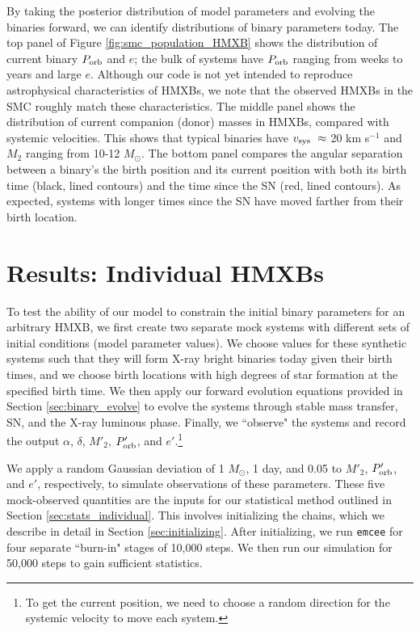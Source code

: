 \documentclass[usenatbib]{mnras}
\newcommand{\Msun}{\ifmmode {M_{\odot}}\else${M_{\odot}}$\fi}
\begin{document}
By taking the posterior distribution of model parameters and evolving the binaries forward, we can identify distributions of binary parameters today. The top panel of Figure \ref{fig:smc_population_HMXB} shows the distribution of current binary $P_{\rm orb}$ and $e$; the bulk of systems have $P_{\rm orb}$ ranging from weeks to years and large $e$. Although our code is not yet intended to reproduce astrophysical characteristics of HMXBs, we note that the observed HMXBs in the SMC roughly match these characteristics. The middle panel shows the distribution of current companion (donor) masses in HMXBs, compared with systemic velocities. This shows that typical binaries have $v_{\rm sys}\ \approx$ 20 km s$^{-1}$ and $M_2$ ranging from 10-12 \Msun. The bottom panel compares the angular separation between a binary's the birth position and its current position with both its birth time (black, lined contours) and the time since the SN (red, lined contours). As expected, systems with longer times since the SN have moved farther from their birth location. 




\section{Results: Individual HMXBs} \label{sec:results_individual}

To test the ability of our model to constrain the initial binary parameters for an arbitrary HMXB, we first create two separate mock systems with different sets of initial conditions (model parameter values). We choose values for these synthetic systems such that they will form X-ray bright binaries today given their birth times, and we choose birth locations with high degrees of star formation at the specified birth time. We then apply our forward evolution equations provided in Section \ref{sec:binary_evolve} to evolve the systems through stable mass transfer, SN, and the X-ray luminous phase. Finally, we ``observe" the systems and record the output $\alpha$, $\delta$, $M'_2$, $P'_{\rm orb}$, and $e'$.\footnote{To get the current position, we need to choose a random direction for the systemic velocity to move each system.} 

We apply a random Gaussian deviation of 1 \Msun, 1 day, and 0.05 to $M'_2$, $P'_{\rm orb}$, and $e'$, respectively, to simulate observations of these parameters. These five mock-observed quantities are the inputs for our statistical method outlined in Section \ref{sec:stats_individual}. This involves initializing the chains, which we describe in detail in Section \ref{sec:initializing}. After initializing, we run {\tt emcee} for four separate ``burn-in" stages of 10,000 steps. We then run our simulation for 50,000 steps to gain sufficient statistics. 
\end{document}
